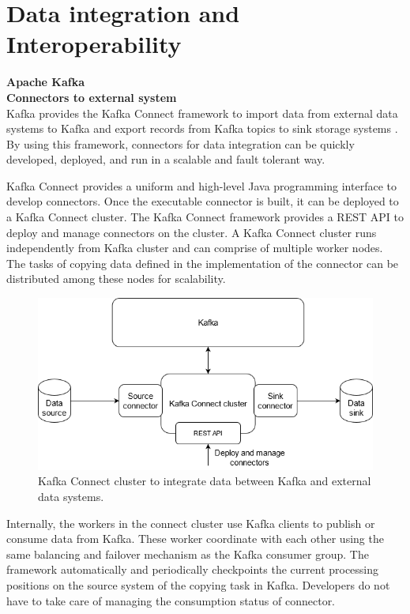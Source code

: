 \section{Data integration and Interoperability}
\large \textbf{Apache Kafka}\\
\normalsize
\textbf{Connectors to external system}\\
Kafka provides the Kafka Connect framework to import data from external data systems to Kafka and export records from Kafka topics to sink storage systems \cite{kafkaconnect}. By using this framework, connectors for data integration can be quickly developed, deployed, and run in a scalable and fault tolerant way. 

Kafka Connect provides a uniform and high-level Java programming interface to develop connectors. Once the executable connector is built, it can be deployed to a Kafka Connect cluster. The Kafka Connect framework provides a REST API to deploy and manage connectors on the cluster. A Kafka Connect cluster runs independently from Kafka cluster and can comprise of multiple worker nodes. The tasks of copying data defined in the implementation of the connector can be distributed among these nodes for scalability. 

\begin{figure}[h]
	\centering
	\includegraphics[width=12cm]{images/connector-kafka.png}
	\caption{Kafka Connect cluster to integrate data between Kafka and external data systems.}
	\label{fig:connectkafka}
\end{figure}

Internally, the workers in the connect cluster use Kafka clients to publish or consume data from Kafka. These worker coordinate with each other using the same balancing and failover mechanism as the Kafka consumer group. The framework automatically and periodically checkpoints the current processing positions on the source system of the copying task in Kafka. Developers do not have to take care of managing the consumption status of connector.

